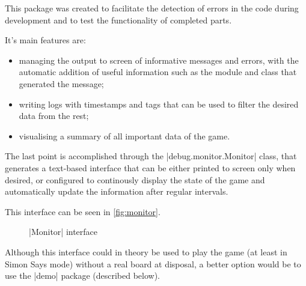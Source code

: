 This package was created to facilitate the detection of errors in the code
during development and to test the functionality of completed parts.

\beforelist It's main features are:
\begin{itemize}
  \item managing the output to screen of informative messages and errors, with
    the automatic addition of useful information such as the module and class
    that generated the message;
  \item writing logs with timestamps and tags that can be used to filter the
    desired data from the rest;
  \item visualising a summary of all important data of the game.
\end{itemize}
\afterlist*
The last point is accomplished through the \Code|debug.monitor.Monitor| class,
that generates a text-based interface that can be either printed to screen only
when desired, or configured to continously display the state of the game and
automatically update the information after regular intervals.

This interface can be seen in \autoref{fig:monitor}.

\begin{figure}[h]
  

  \caption[ interface]{\Code|Monitor| interface}
  \label{fig:monitor}
\end{figure}

Although this interface could in theory be used to play the game (at least in
Simon Says mode) without a real board at disposal, a better option would be to
use the \Code|demo| package (described below).
